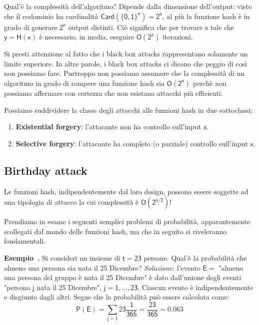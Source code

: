 \documentclass{article}
\newcounter{example}[section]
\newenvironment{example}[1][]{\refstepcounter{example}\par\medskip
   \noindent \textbf{Esempio~\theexample. #1} \rmfamily}{\medskip}
\begin{document}
\par Qual'è la complessità dell'algoritmo? Dipende dalla dimensione dell'output: visto che il codominio ha 
cardinalità $\mathsf{Card \left( \{0,1\}^n \right) = 2^n}$, al più la funzione hash è in grado di generare 
$\mathsf{2^n}$ output distinti. Ciò significa che per trovare $\mathsf{x}$ tale che $\mathsf{y = H(x)}$ 
è necessario, in media, eseguire $\mathsf{O(2^n)}$ iterazioni.

\par \noindent Si presti attenzione al fatto che i black box attacks rappresentano solamente un limite superiore. 
In altre parole, i black box attacks ci dicono che peggio di così non possiamo fare. Purtroppo non possiamo assumere 
che la complessità di un algoritmo in grado di rompere una funzione hash sia $\mathsf{O(2^n)}$ perchè non possiamo 
affermare con certezza che non esistano attacchi più efficienti. \newline

\par \noindent Possiamo suddividere la classe degli attacchi alle funzioni hash in due sottoclassi:

\begin{enumerate}
    \item \textbf{Existential forgery}: l'attacante non ha controllo sull'input $\mathsf{x}$.
    \item \textbf{Selective forgery}: l'attacante ha completo (o parziale) controllo sull'input $\mathsf{x}$.
\end{enumerate}

\subsection{Birthday attack}
Le funzioni hash, indipendentemente dal loro design, possono essere soggette ad una tipologia di attacco la 
cui complessità è $\mathsf{O(2^{n/2})}$!

\par \noindent Prendiamo in esame i seguenti semplici problemi di probabilità, apparantemente scollegati dal 
mondo delle funzioni hash, ma che in seguito si riveleranno fondamentali.

\begin{example}
    Si consideri un insieme di $\mathsf{t = 23}$ persone. Qual'è la probabilità che almeno una persona sia 
    nata il 25 Dicembre? \newline
    \textit{Soluzione}: l'evento $\mathsf{E = }$ "almeno una persona del gruppo è nata il 25 Dicembre" è 
    dato dall'unione degli eventi "persona $\mathsf{j}$ nata il 25 Dicembre", $\mathsf{j = 1, ..., 23}$. 
    Ciascun evento è indipendentemente e disgiunto dagli altri. Segue che la probabilità può essere calcolata come:
    \begin{equation*}
        \mathsf{P(E) = \sum_{j = 1}{23} \frac{1}{365} = \frac{23}{365} = 0.063}
    \end{equation*}
\end{example}
\end{document}
